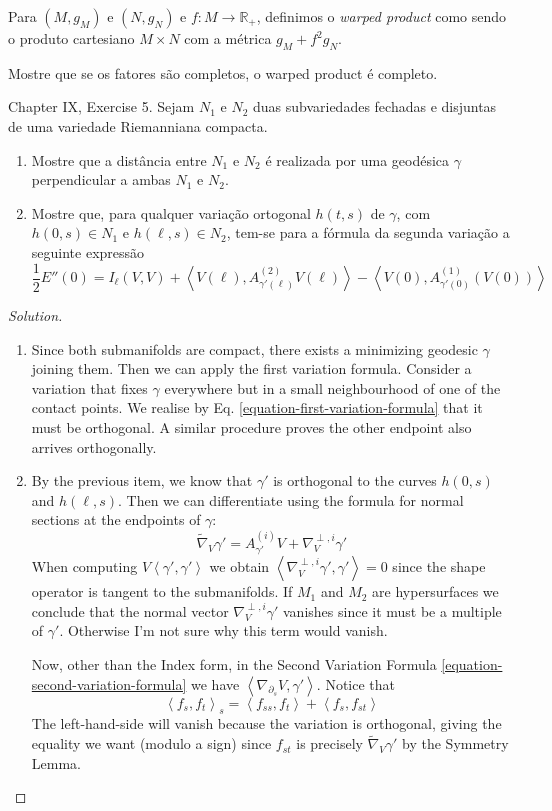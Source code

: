\begin{exercise}
\label{exercise-wraped-product}
Para $(M,g_M)$ e $(N,g_N)$ e $f:M \to \mathbb{R}_+$, definimos o {\it warped
product} como sendo o produto cartesiano $M\times N$ com a métrica 
 $g_M+f^2g_N$.

Mostre que se os fatores são completos, o warped product é completo.
\end{exercise}

\begin{exercise}
\label{exercise-two-submanifolds}
\cite{doc} Chapter IX, Exercise 5. Sejam $N_1$ e $N_2$ duas subvariedades
 fechadas e disjuntas de uma variedade Riemanniana compacta.
\begin{enumerate}
\item Mostre que a distância entre $N_1$ e $N_2$ é realizada por uma geodésica
	$\gamma$ perpendicular a ambas $N_1$ e $N_2$.
\item Mostre que, para qualquer variação ortogonal $h(t,s)$ de $\gamma$, com
$h(0,s) \in N_1$ e $h(\ell,s) \in N_2$, tem-se para a fórmula da segunda
variação a seguinte expressão
$$
\frac{1}{2}E''(0)=I_{\ell}(V,V)+
\left<V(\ell),A_{\gamma'(\ell)}^{(2)}V(\ell)\right>
-\left<V(0),A^{(1)}_{\gamma'(0)}(V(0))\right>
$$
\end{enumerate}
\end{exercise}

\begin{proof}[Solution]
\begin{enumerate}
\item Since both submanifolds are compact, there exists a minimizing geodesic
$\gamma$ joining them. Then we can apply the first variation formula. Consider a
variation that fixes $\gamma$ everywhere but in a small neighbourhood of one of
the contact points. We realise by Eq. \ref{equation-first-variation-formula}
that it must be orthogonal. A similar procedure proves the other endpoint also
arrives orthogonally.

\item By the previous item, we
know that $\gamma'$ is orthogonal to the curves $h(0,s)$ and $h(\ell,s)$. Then
we can differentiate using the formula for normal sections at the endpoints of
$\gamma$:
$$
\tilde{\nabla}_{V}\gamma'=A^{(i)}_{\gamma'}V+\nabla^{\perp,i}_V\gamma'
$$
When computing $V\left<\gamma',\gamma'\right>$ we obtain
$\left<\nabla^{\perp,i}_V\gamma',\gamma'\right>=0$ since the shape operator is
tangent to the submanifolds. If $M_1$ and $M_2$ are hypersurfaces we conclude 
that the normal vector $\nabla^{\perp,i}_V\gamma'$ vanishes since it must be a 
multiple of $\gamma'$. Otherwise I'm not sure why this term would vanish.

Now, other than the Index form, in the Second Variation Formula
\ref{equation-second-variation-formula} we have
$\left<\nabla_{\partial_s}V,\gamma'\right>$. Notice that
$$
\left<f_s,f_t\right>_s=\left<f_{ss},f_t\right>+\left<f_s,f_{st}\right>
$$
The left-hand-side will vanish because the variation is orthogonal, giving the
equality we want (modulo a sign) since $f_{st}$ is precisely
$\tilde{\nabla}_V\gamma'$ by the Symmetry Lemma.
\end{enumerate}
\end{proof}

